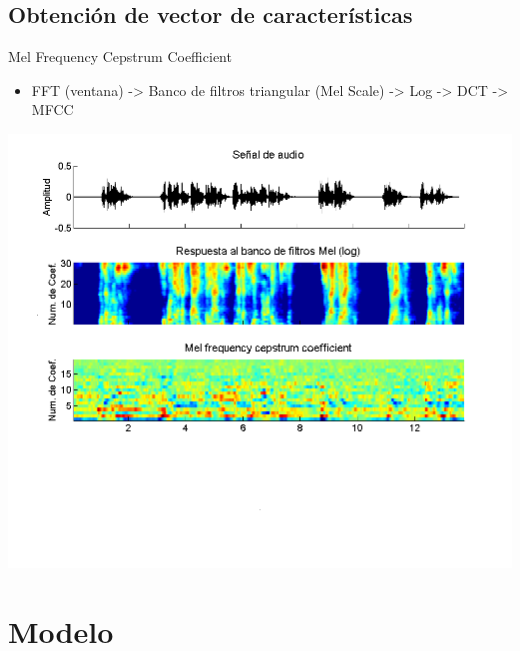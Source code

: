 \documentclass[10pt]{beamer}
\begin{document}
\subsection{Obtención de vector de características}

\begin{frame}{Mel Frequency Cepstrum Coefficient}
	\begin{itemize}
		\item \small{FFT (ventana) -> Banco de filtros triangular (Mel Scale) -> Log -> DCT -> MFCC}
	\end{itemize}	
	\begin{center}
	  \includegraphics[width=1\textwidth]{gfx/f-mfcc}
  \end{center}
\end{frame}

\section{Modelo}
\end{document}
